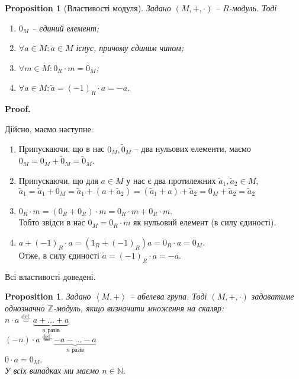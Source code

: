\documentclass[a4paper, 10pt]{article}
\makeatletter
\theoremstyle{theoremdd}
\theoremstyle{theoremdd}
\theoremstyle{theoremdd}
\theoremstyle{theoremdd}
\theoremstyle{theoremdd}
\theoremstyle{theoremdd}
\theoremstyle{theoremdd}
\theoremstyle{theoremdd}
\theoremstyle{theoremdd}
\newtheorem{proposition}[theorem]{Proposition}
\theoremstyle{theoremdd}
\theoremstyle{theoremdd}
\theoremstyle{theoremdd}
\theoremstyle{theoremdd}
\theoremstyle{theoremdd}
\theoremstyle{theoremdd}
\renewenvironment{proof}[1][Proof.\\]{\par
\pushQED{\hfill \qed}%
\normalfont \topsep6\p@\@plus6\p@\relax
\trivlist
\item\relax
{\bfseries
#1\@addpunct{.}}\hspace\labelsep\ignorespaces
}{%
\popQED\endtrivlist\@endpefalse
}
\newcommand{\eqbydef}{\overset{\text{def.}}{=}}
\makeatother
\begin{document}
\begin{proposition}[Властивості модуля]
Задано $(M,+,\cdot)$ -- $R$-модуль. Тоді
\begin{enumerate}[nosep,wide=0pt,label={\arabic*)}]
\item $0_M$ -- єдиний елемент;
\item $\forall a \in M: \tilde{a} \in M$ існує, причому єдиним чином;
\item $\forall m \in M: 0_R \cdot m = 0_M$;
\item $\forall a \in M: \tilde{a} = (-1)_R \cdot a = -a$.
\end{enumerate}
\end{proposition}

\begin{proof}
Дійсно, маємо наступне:
\begin{enumerate}[wide=0pt,label={\arabic*)}]
\item Припускаючи, що в нас $0_M, \tilde{0}_M$ -- два нульових елементи, маємо\\
$0_M = 0_M + \tilde{0}_M = \tilde{0}_M$.
\item Припускаючи, що для $a \in M$ у нас є два протилежних $\tilde{a}_1,\tilde{a}_2 \in M$,\\
$\tilde{a}_1 = \tilde{a}_1 + 0_M = \tilde{a}_1 + (a + \tilde{a}_2) = (\tilde{a}_1 + a) + \tilde{a}_2 = 0_M + \tilde{a}_2 = \tilde{a}_2$
\item $0_R \cdot m = (0_R + 0_R) \cdot m = 0_R \cdot m + 0_R \cdot m$.\\
Тобто звідси в нас $0_M = 0_R \cdot m$ як нульовий елемент (в силу єдиності).
\item $a + (-1)_R \cdot a = (1_R + (-1)_R) a = 0_R \cdot a = 0_M$.\\
Отже, в силу єдиності $\tilde{a} = (-1)_R \cdot a = -a$.
\end{enumerate}
Всі властивості доведені.
\end{proof}

\begin{proposition}
Задано $\left<M,+\right>$ -- абелева група. Тоді $(M,+,\cdot)$ задаватиме однозначно $\mathbb{Z}$-модуль, якщо визначити множення на скаляр:\\
$n \cdot a \eqbydef \underbrace{a+\dots+a}_{n \text{ разів}}$\\
$(-n) \cdot a \eqbydef \underbrace{-a-\dots-a}_{n \text{ разів}}$\\
$0 \cdot a = 0_M$.\\
У всіх випадках ми маємо $n \in \mathbb{N}$.
\end{proposition}
\end{document}

